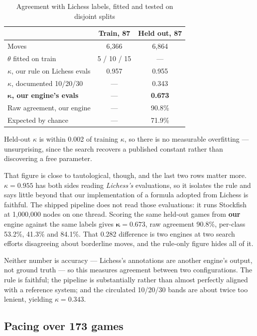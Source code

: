 \documentclass[conference]{IEEEtran}
\newcommand{\tabsize}{\footnotesize}
\begin{document}
\begin{table}[!t]
\caption{Agreement with Lichess labels, fitted and tested on disjoint splits}
\label{tab:agreement}
\centering
\tabsize
\begin{tabular}{lcc}
\toprule
 & \textbf{Train, 87} & \textbf{Held out, 87} \\
\midrule
Moves & 6,366 & 6,864 \\
$\theta$ fitted on train & 5 / 10 / 15 & --- \\
$\kappa$, our rule on Lichess evals & 0.957 & 0.955 \\
$\kappa$, documented 10/20/30 & --- & 0.343 \\
$\boldsymbol{\kappa}$\textbf{, our engine's evals} & --- & \textbf{0.673} \\
Raw agreement, our engine & --- & 90.8\% \\
Expected by chance & --- & 71.9\% \\
\bottomrule
\end{tabular}
\end{table}

Held-out $\kappa$ is within 0.002 of training $\kappa$, so there is no
measurable overfitting --- unsurprising, since the search recovers a
published constant rather than discovering a free parameter.

That figure is close to tautological, though, and the last two rows matter
more. $\kappa = 0.955$ has both sides reading \emph{Lichess's} evaluations,
so it isolates the rule and says little beyond that our implementation of a
formula adopted from Lichess is faithful. The shipped pipeline does not read
those evaluations: it runs Stockfish at 1,000,000 nodes on one thread.
Scoring the same held-out games from \textbf{our} engine against the same
labels gives $\boldsymbol{\kappa = 0.673}$, raw agreement 90.8\%, per-class
53.2\%, 41.3\% and 84.1\%. That 0.282 difference is two engines at two
search efforts disagreeing about borderline moves, and the rule-only figure
hides all of it.

Neither number is accuracy --- Lichess's annotations are another engine's
output, not ground truth --- so this measures agreement between two
configurations. The rule is faithful; the pipeline is substantially rather
than almost perfectly aligned with a reference system; and the circulated
10/20/30 bands are about twice too lenient, yielding $\kappa = 0.343$.

\subsection{Pacing over 173 games}
\label{sec:pacing-results}
\end{document}
